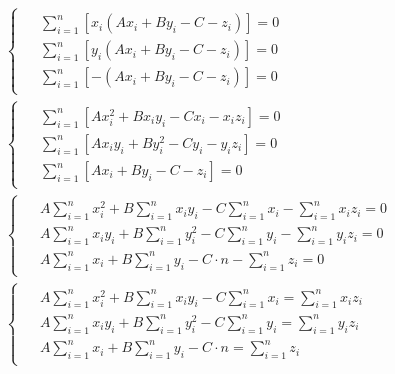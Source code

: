 \begin{align}
    \nonumber
    &\begin{cases}
         \begin{aligned}
             &\sum_{i=1}^{n} \left[ x_i \left( A x_i + B y_i - C - z_i \right) \right] = 0 \\
             &\sum_{i=1}^{n} \left[ y_i \left( A x_i + B y_i - C - z_i \right) \right] = 0 \\
             &\sum_{i=1}^{n} \left[ - \left( A x_i + B y_i - C - z_i \right) \right] = 0
         \end{aligned}
    \end{cases} \\ \nonumber
    &\begin{cases}
         \begin{aligned}
             &\sum_{i=1}^{n} \left[ A x_i^2 + B x_i y_i - C x_i - x_i z_i \right] = 0 \\
             &\sum_{i=1}^{n} \left[ A x_i y_i + B y_i^2 - C y_i - y_i z_i \right] = 0 \\
             &\sum_{i=1}^{n} \left[ A x_i + B y_i - C - z_i \right] = 0
         \end{aligned}
    \end{cases} \\ \nonumber
    &\begin{cases}
         \begin{aligned}
             &A \sum_{i=1}^{n} x_i^2
             + B \sum_{i=1}^{n} x_i y_i
             - C \sum_{i=1}^{n} x_i
             - \sum_{i=1}^{n} x_i z_i = 0 \\
             &A \sum_{i=1}^{n} x_i y_i
             + B \sum_{i=1}^{n} y_i^2
             - C \sum_{i=1}^{n} y_i
             - \sum_{i=1}^{n} y_i z_i = 0 \\
             &A \sum_{i=1}^{n} x_i
             + B \sum_{i=1}^{n} y_i
             - C \cdot n - \sum_{i=1}^{n} z_i = 0
         \end{aligned}
    \end{cases} \\
    &\begin{cases}
         \label{eq:FindDetail:Plane_MNK_Final_System}
         \begin{aligned}
             &A \sum_{i=1}^{n} x_i^2
             + B \sum_{i=1}^{n} x_i y_i
             - C \sum_{i=1}^{n} x_i
             = \sum_{i=1}^{n} x_i z_i \\
             &A \sum_{i=1}^{n} x_i y_i
             + B \sum_{i=1}^{n} y_i^2
             - C \sum_{i=1}^{n} y_i
             = \sum_{i=1}^{n} y_i z_i \\
             &A \sum_{i=1}^{n} x_i
             + B \sum_{i=1}^{n} y_i
             - C \cdot n = \sum_{i=1}^{n} z_i
         \end{aligned}
    \end{cases}
\end{align} \\

